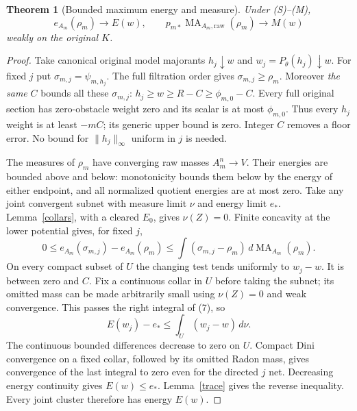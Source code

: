 \documentclass[11pt]{article}
\newtheorem{theorem}{Theorem}
\newcommand{\MA}{\operatorname{MA}}
\begin{document}
\begin{theorem}[Bounded maximum energy and measure]\label{maxlimit}
Under (S)--(M),
\[
 e_{A_m}(\rho_m)\longrightarrow E(w),\qquad
 p_{m*}\MA_{A_m,\mathrm{raw}}(\rho_m)\longrightarrow M(w)
                                                        \tag{6}
\]
weakly on the original $K$.
\end{theorem}
\begin{proof}
Take canonical original model majorants $h_j\downarrow w$ and
$w_j=P_\theta(h_j)\downarrow w$.
For fixed $j$ put $\sigma_{m,j}=\psi_{m,h_j}$.
The full filtration order gives $\sigma_{m,j}\geq\rho_m$.
Moreover \emph{the same} $C$ bounds all these $\sigma_{m,j}$:
$h_j\geq w\geq R-C\geq\phi_{m,0}-C$.
Every full original section has zero-obstacle weight zero and its
scalar is at most $\phi_{m,0}$. Thus every $h_j$ weight is at least
$-mC$; its generic upper bound is zero.
Integer $C$ removes a floor error. No bound for $\|h_j\|_\infty$
uniform in $j$ is needed.

The measures of $\rho_m$ have converging raw masses $A_m^n\to V$.
Their energies are bounded above and below: monotonicity bounds them
below by the energy of either endpoint, and all normalized quotient
energies are at most zero. Take any joint convergent subnet with
measure limit $\nu$ and energy limit $e_*$. Lemma~\ref{collars},
with a cleared $E_0$, gives $\nu(Z)=0$.
Finite concavity at the lower potential gives, for fixed $j$,
\[
 0\leq e_{A_m}(\sigma_{m,j})-e_{A_m}(\rho_m)
       \leq\int(\sigma_{m,j}-\rho_m)\,d\MA_{A_m}(\rho_m).
                                                               \tag{7}
\]
On every compact subset of $U$ the changing test tends uniformly
to $w_j-w$. It is between zero and $C$.
Fix a continuous collar in $U$ before taking the subnet; its omitted
mass can be made arbitrarily small using $\nu(Z)=0$ and weak
convergence. This passes the right integral of (7), so
\[
 E(w_j)-e_*\leq\int_U(w_j-w)\,d\nu .
\]
The continuous bounded differences decrease to zero on $U$.
Compact Dini convergence on a fixed collar, followed by its omitted
Radon mass, gives convergence of the last integral to zero even for
the directed $j$ net. Decreasing energy continuity gives
$E(w)\leq e_*$. Lemma~\ref{trace} gives the reverse inequality.
Every joint cluster therefore has energy $E(w)$.


\end{proof}
\end{document}
